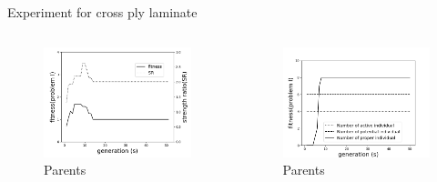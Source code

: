 \documentclass{beamer}
\begin{document}
\begin{frame}{Experiment for  cross ply laminate}
    \begin{columns}[c]
    \begin{column}{0.5\textwidth}
		\begin{figure}
			\includegraphics[scale=0.4]{fig/chapter4_first_result_strength_ratio_and_fitness.png}
			\caption{Parents}
		\end{figure}
    \end{column}
	\begin{column}{0.5\textwidth}
		\begin{figure}
			\includegraphics[scale=0.4]{fig/chapter4_first_result_number_of_three_groups.png}
			\caption{Parents}
		\end{figure}
	\end{column}
\end{columns}
\end{frame}
\end{document}
